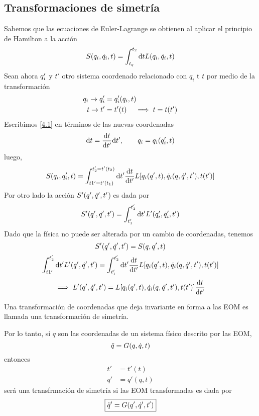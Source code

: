 \subsection{Transformaciones de simetría}
Sabemos que las ecuaciones de Euler-Lagrange se obtienen al aplicar el principio de Hamilton a la acción
\begin{equation}\label{4.1}
  S(q_i,\dot{q}_i,t)=\int_{t_q}^{t_2}\dd t L(q_i,\dot{q}_i,t)
\end{equation}
Sean ahora $q'_i$ y $t'$ otro sistema coordenado relacionado con $q_i$ t $t$ por medio de la transformación
\begin{align}
  q_i\to q'_i&=q'_i(q_i,t)\\
  t\to t'&=t'(t)\quad \implies t=t(t')
\end{align}
Escribimos \eqref{4.1} en términos de las nuevas coordenadas
\begin{equation}
  \dd t=\dv{t}{t'}\dd t',\qquad q_i=q_i(q'_i,t)
\end{equation}
luego,
\begin{equation}\label{4.2}
  S(q_i,q'_i,t)=\int_{t1'=t'(t_1)}^{t_2'=t'(t_2)}\dd t'\dv{t}{t'} L[q_i(q',t),\dot{q}_i(q,\dot{q}',t'),t(t')]
\end{equation}
Por otro lado la acción $S'(q',\dot{q}',t'$) es dada por
\begin{equation}\label{4.3}
  S'(q',\dot{q}',t')=\int_{t_1'}^{t_2'}\dd t' L'(q'_i,\dot{q}'_i,t')
\end{equation}
Dado que la física no puede ser alterada por un cambio de coordenadas, tenemos
\begin{equation}\label{4.4}
  S'(q',\dot{q}',t')=S(q,q',t)
\end{equation}
\begin{equation}
  \int_{t1'}^{t_2'}\dd t' L'(q',\dot{q}',t')=\int_{t_1'}^{t_2'}\dd t'\dv{t}{t'} L[q_i(q',t),\dot{q}_i(q,\dot{q}',t'),t(t')]
\end{equation}
\begin{equation}
  \implies L'(q',\dot{q}',t')=L[q_i(q',t),\dot{q}_i(q,\dot{q}',t'),t(t')]\dv{t}{t'}
\end{equation}

\begin{tcolorbox}
	Una transformación de coordenadas que deja invariante en forma a las EOM es llamada una transformación de simetría.
\end{tcolorbox}
Por lo tanto, si $q$ son las coordenadas de un sistema físico descrito por las EOM,
\begin{equation}
  \ddot{q}=G(q,\dot{q},t)
\end{equation}
entonces \begin{align}
  t'&=t'(t)\\
  q'&=q'(q,t)
\end{align}
será una transfrmación de simetría si las EOM transformadas es dada por
\begin{equation}
\boxed{  \ddot{q}'=G(q',\dot{q}',t')}
\end{equation}

